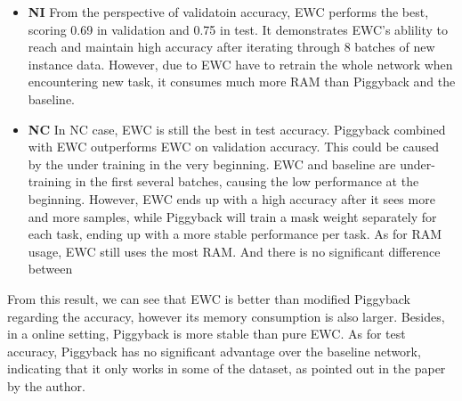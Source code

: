 \begin{itemize}
\item \textbf{NI} 
From the perspective of validatoin accuracy, EWC performs the best, scoring 0.69 in validation and 0.75 in test. It demonstrates EWC's ablility to reach and maintain high accuracy after iterating through 8 batches of new instance data. However, due to EWC have to retrain the whole network when encountering new task, it consumes much more RAM than Piggyback and the baseline. 
\item \textbf{NC}
In NC case, EWC is still the best in test accuracy. Piggyback combined with EWC outperforms EWC on validation accuracy. This could be caused by the under training in the very beginning. EWC and baseline are under-training in the first several batches, causing the low performance at the beginning. However, EWC ends up with a high accuracy after it sees more and more samples, while Piggyback will train a mask weight separately for each task, ending up with a more stable performance per task. As for RAM usage, EWC still uses the most RAM. And there is no significant difference between 
\end{itemize}

From this result, we can see that EWC is better than modified Piggyback regarding the accuracy, however its memory consumption is also larger. Besides, in a online setting, Piggyback is more stable than pure EWC. As for test accuracy, Piggyback has no significant advantage over the baseline network, indicating that it only works in some of the dataset, as pointed out in the paper by the author.





